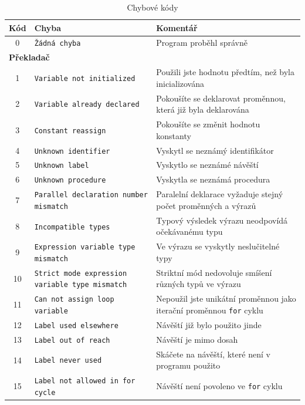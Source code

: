 \documentclass[
12pt,
a4paper,
pdftex,
czech,
titlepage
]{report}
\begin{document}
\begin{longtable}{|c|p{5.5cm}|p{6.5cm}|}
\caption{Chybové kódy}
\label{chyby}
\endfirsthead
\endhead
\hline
		\textbf{Kód} & \textbf{Chyba} & \textbf{Komentář} \\
\hline\hline
\rule{0pt}{3ex}0 & \texttt{Žádná chyba} & Program proběhl správně \\ \hline
\multicolumn{3}{|l|}{\textbf{Překladač}}\\ \hline
\rule{0pt}{3ex}1 & \texttt{Variable not initialized} & Použili jste hodnotu předtím, než byla inicializována \\ \hline
\rule{0pt}{3ex}2 & \texttt{Variable already declared} & Pokoušíte se deklarovat proměnnou, která již byla deklarována \\ \hline
\rule{0pt}{3ex}3 & \texttt{Constant reassign} & Pokoušíte se změnit hodnotu konstanty \\ \hline
\rule{0pt}{3ex}4 & \texttt{Unknown identifier} & Vyskytl se neznámý identifikátor \\ \hline
\rule{0pt}{3ex}5 & \texttt{Unknown label} & Vyskytlo se neznámé návěští \\ \hline
\rule{0pt}{3ex}6 & \texttt{Unknown procedure} & Vyskytla se neznámá procedura \\ \hline
\rule{0pt}{3ex}7 & \texttt{Parallel declaration number mismatch} & Paralelní deklarace vyžaduje stejný počet proměnných a výrazů\\ \hline
\rule{0pt}{3ex}8 & \texttt{Incompatible types} & Typový výsledek výrazu neodpovídá očekávanému typu \\ \hline
\rule{0pt}{3ex}9 & \texttt{Expression variable type mismatch} & Ve výrazu se vyskytly neslučitelné typy \\ \hline
\rule{0pt}{3ex}10 & \texttt{Strict mode expression variable type mismatch} & Striktní mód nedovoluje smíšení různých typů ve výrazu \\ \hline
\rule{0pt}{3ex}11 & \texttt{Can not assign loop variable} & Nepoužil jste unikátní proměnnou jako iterační proměnnou \texttt{for} cyklu \\ \hline
\rule{0pt}{3ex}12 & \texttt{Label used elsewhere} & Návěští již bylo použito jinde \\ \hline
\rule{0pt}{3ex}13 & \texttt{Label out of reach} & Návěští je mimo dosah \\ \hline
\rule{0pt}{3ex}14 & \texttt{Label never used} & Skáčete na návěští, které není v programu použito \\ \hline
\rule{0pt}{3ex}15 & \texttt{Label not allowed in for cycle} & Návěští není povoleno ve \texttt{for} cyklu \\ \hline

\end{longtable}
\end{document}
